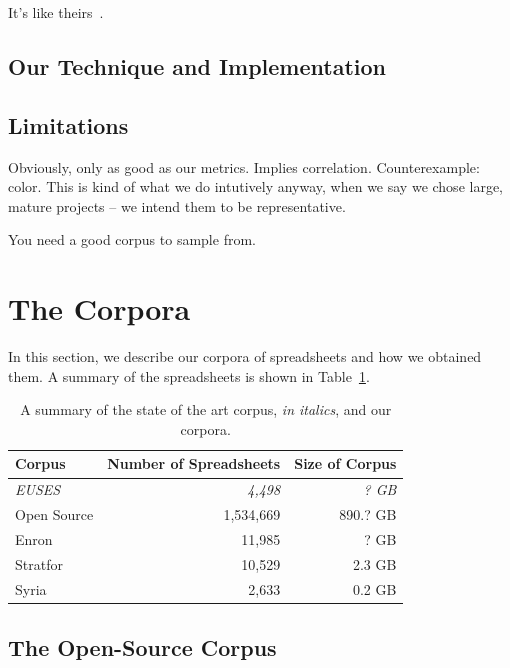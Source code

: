\documentclass[conference]{IEEEtran}
\begin{document}
It's like theirs~\cite{nagappan2013diversity}.

\subsection{Our Technique and Implementation}

\subsection{Limitations}

Obviously, only as good as our metrics. Implies correlation. Counterexample: color.
This is kind of what we do intutively anyway, when we say we chose large, mature projects -- we intend them
to be representative.

You need a good corpus to sample from.

\section{The Corpora}

In this section, we describe our corpora of spreadsheets
and how we obtained them.
A summary of the spreadsheets is shown in Table~\ref{tab:corpusoverview}.

\begin{table}
	\caption{A summary of the state of the art corpus, \textit{in italics},
	and our corpora.}\label{tab:corpusoverview}
	
	\begin{tabular}{ l r r }
		\toprule
		\textbf{Corpus} & \textbf{Number of Spreadsheets} & \textbf{Size of Corpus}\\
		\midrule	  	
	  	\textit{EUSES~\cite{fisher2005euses}} & \textit{4,498} & \textit{? GB}\\	  	
	  	Open Source & 1,534,669 & 890.? GB \\
	  	Enron & 11,985 & ? GB \\ 
		Stratfor & 10,529 & 2.3 GB\\
		Syria & 2,633 & 0.2 GB\\
		\bottomrule
	\end{tabular}
\end{table}

\subsection{The Open-Source Corpus}
\end{document}
